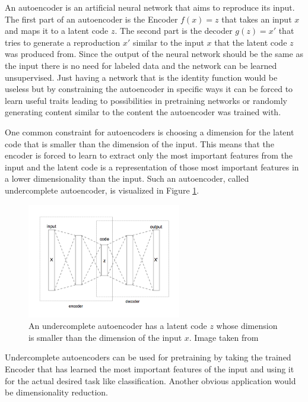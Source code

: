 An autoencoder is an artificial neural network that aims to reproduce its input. The first part
of an autoencoder is the Encoder $f(x)=z$ that takes an input $x$ and maps it to a latent code $z$.
The second part is the decoder $g(z)=x'$ that tries to generate a reproduction $x'$ similar to the
input $x$ that the latent code $z$ was produced from. Since the output of the neural network should
be the same as the input there is no need for labeled data and the network can be learned unsupervised.
Just having a network that is the identity function would be useless but by constraining the autoencoder
in specific ways it can be forced to learn useful traits leading to possibilities in pretraining 
networks or randomly generating content similar to the content the autoencoder was trained with.

One common constraint for autoencoders is choosing a dimension for the latent code that is smaller
than the dimension of the input. This means that the encoder is forced to learn to extract only the
most important features from the input and the latent code is a representation of those most
important features in a lower dimensionality than the input. Such an autoencoder, called
undercomplete autoencoder, is visualized in Figure \ref{figure_undercomplete_ae}.

\begin{figure}[h]
    \centering
    \includegraphics[width=0.6\textwidth]{images/figures/Autoencoder_structure.png}
    \caption{An undercomplete autoencoder has a latent code $z$ whose dimension is smaller than the 
    dimension of the input $x$.
    Image taken from \parencite{2015-Chervinskii-autoencoder}} \label{figure_undercomplete_ae}
\end{figure}

Undercomplete autoencoders can be used for pretraining by taking the trained Encoder that has 
learned the most important features of the input and using it for the actual desired task like 
classification. Another obvious application would be dimensionality reduction.

